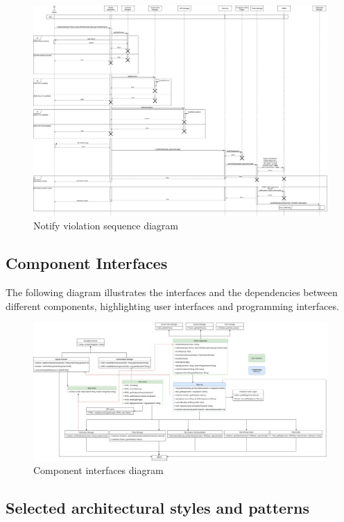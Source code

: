 \documentclass{article}
\begin{document}
	\begin{figure}[h]
		\includegraphics[width=\linewidth]{images/Notify_Violation_sequence_diagram.png}
		\caption{Notify violation sequence diagram}
	\end{figure}	
	\newpage \FloatBarrier
	\subsection{Component Interfaces}
	The following diagram illustrates the interfaces and the dependencies between different components, highlighting user interfaces and programming interfaces.
		\begin{figure}[H]
			\includegraphics[width=\linewidth]{images/Interface_diagram.png}
			\caption{Component interfaces diagram}
		\end{figure}
	\subsection{Selected architectural styles and patterns} \label{sec:Patterns}
\end{document}
